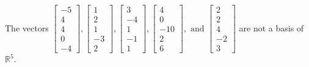 \begin{exercise}
\begin{exerciseStatement}
  \end{exerciseStatement}
  \begin{exerciseAnswer}
   The vectors \(\left[\begin{array}{r}
-5 \\
4 \\
4 \\
0 \\
-4
\end{array}\right] , \left[\begin{array}{r}
1 \\
2 \\
1 \\
-3 \\
2
\end{array}\right] , \left[\begin{array}{r}
3 \\
-4 \\
1 \\
-1 \\
1
\end{array}\right] , \left[\begin{array}{r}
4 \\
0 \\
-10 \\
2 \\
6
\end{array}\right] , \text{ and } \left[\begin{array}{r}
2 \\
2 \\
4 \\
-2 \\
3
\end{array}\right]\) 
  	 are not  a basis of \(\mathbb{R}^5\).
  


  \end{exerciseAnswer}
\end{exercise}